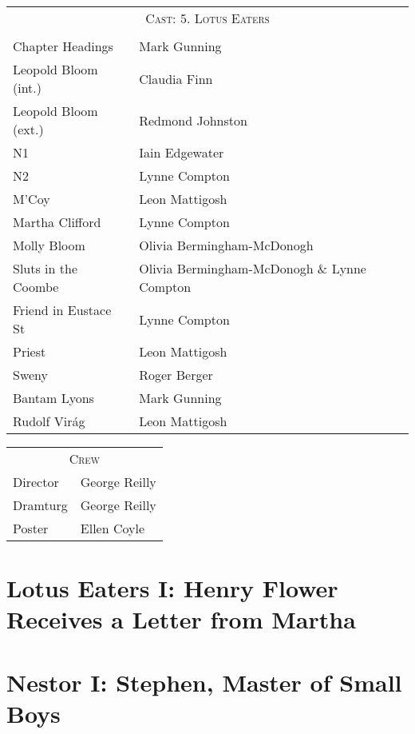 \begin{tabular}{lp{10cm}}
    \multicolumn{2}{c}{\Large \textsc{Cast: 5. Lotus Eaters}} \\
\\
Chapter Headings & Mark Gunning \\
Leopold Bloom (int.) & Claudia Finn \\
Leopold Bloom (ext.) & Redmond Johnston \\
N1 & Iain Edgewater \\
N2 & Lynne Compton \\
M'Coy & Leon Mattigosh \\
Martha Clifford & Lynne Compton \\
Molly Bloom & Olivia Bermingham-McDonogh \\
Sluts in the Coombe & Olivia Bermingham-McDonogh \& Lynne Compton \\
Friend in Eustace St & Lynne Compton \\
Priest & Leon Mattigosh \\
Sweny & Roger Berger \\
Bantam Lyons & Mark Gunning \\
Rudolf Virág & Leon Mattigosh \\
\end{tabular}

\bigskip
\bigskip
\bigskip

\begin{tabular}{lp{10cm}}
    \multicolumn{2}{c}{\Large \textsc{Crew}} \\
Director & George Reilly \\
Dramturg & George Reilly \\
Poster & Ellen Coyle \\
\end{tabular}
\thispagestyle{empty}

\newpage


\setcounter{page}{1}

\section*{Lotus Eaters I: Henry Flower Receives a Letter from Martha}


\section*{Nestor I: Stephen, Master of Small Boys}


